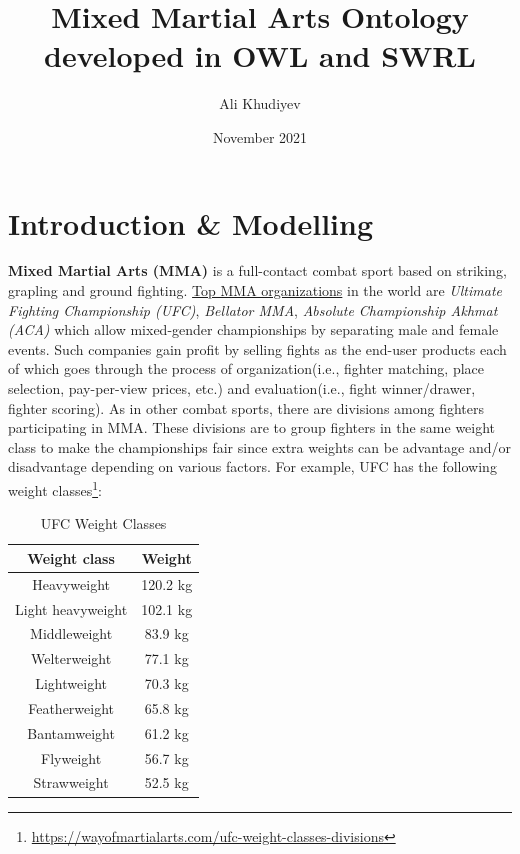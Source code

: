 \documentclass[a4paper]{article}
\title{Mixed Martial Arts Ontology developed in OWL and SWRL}
\author{Ali Khudiyev}
\date{November 2021}
\begin{document}
\maketitle

\section{Introduction \& Modelling}
\textbf{Mixed Martial Arts (MMA)} is a full-contact combat sport based on striking, grapling and ground fighting. \href{https://www.sportsunfold.com/top-10-best-mma-organizations-promotions}{Top MMA organizations} in the world are \textit{Ultimate Fighting Championship (UFC)}, \textit{Bellator MMA}, \textit{Absolute Championship Akhmat (ACA)} which allow mixed-gender championships by separating male and female events. Such companies gain profit by selling fights as the end-user products each of which goes through the process of organization(i.e., fighter matching, place selection, pay-per-view prices, etc.) and evaluation(i.e., fight winner/drawer, fighter scoring). As in other combat sports, there are divisions among fighters participating in MMA. These divisions are to group fighters in the same weight class to make the championships fair since extra weights can be advantage and/or disadvantage depending on various factors. For example, UFC has the following weight classes\footnote{\url{https://wayofmartialarts.com/ufc-weight-classes-divisions}}:

\begin{table}[H]
	\centering
	\begin{tabular}{c|c}
		\textbf{Weight class} & \textbf{Weight} \\
		\hline
		Heavyweight & 120.2 kg \\
		\hline
		Light heavyweight & 102.1 kg \\
		\hline
		Middleweight & 83.9 kg \\
		\hline
		Welterweight & 77.1 kg \\
		\hline
		Lightweight & 70.3 kg \\
		\hline
		Featherweight & 65.8 kg \\
		\hline
		Bantamweight & 61.2 kg \\
		\hline
		Flyweight & 56.7 kg \\
		\hline
		Strawweight & 52.5 kg
	\end{tabular}
	\caption{UFC Weight Classes}
	\label{tab:ufc_divisions}
\end{table}
\end{document}
